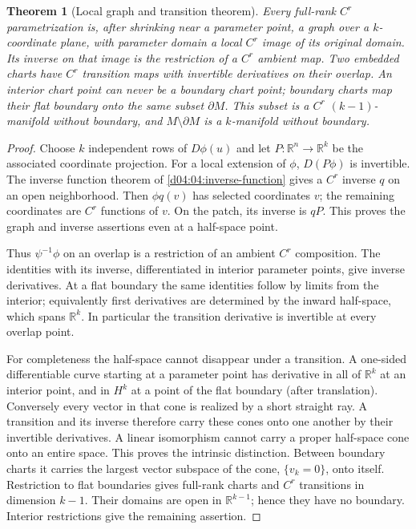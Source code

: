 \documentclass[11pt,oneside,openany]{book}
\newtheorem{theorem}{Theorem}[chapter]
\theoremstyle{definition}
\theoremstyle{remark}
\newcommand{\R}{\mathbb R}
\begin{document}
\begin{theorem}[Local graph and transition theorem]\label{d04:14:charts}
Every full-rank $C^r$ parametrization is, after shrinking near a parameter
point, a graph over a $k$-coordinate plane, with parameter domain a local
$C^r$ image of its original domain. Its inverse on that image is the
restriction of a $C^r$ ambient map. Two embedded charts have $C^r$
transition maps with invertible derivatives on their overlap. An interior
chart point can never be a boundary chart point; boundary charts map their
flat boundary onto the same subset $\partial M$. This subset is a $C^r$
$(k-1)$-manifold without boundary, and $M\setminus\partial M$ is a
$k$-manifold without boundary.
\end{theorem}
\begin{proof}
Choose $k$ independent rows of $D\phi(u)$ and let $P:\R^n\to\R^k$
be the associated coordinate projection. For a local extension of $\phi$,
$D(P\phi)$ is invertible. The inverse function theorem of
\cref{d04:04:inverse-function} gives a $C^r$ inverse $q$ on an open neighborhood.
Then $\phi q(v)$ has selected coordinates $v$; the remaining coordinates
are $C^r$ functions of $v$. On the patch, its inverse is $qP$. This proves
the graph and inverse assertions even at a half-space point.

Thus $\psi^{-1}\phi$ on an overlap is a restriction of an ambient $C^r$
composition. The identities with its inverse, differentiated in interior
parameter points, give inverse derivatives. At a flat boundary the same
identities follow by limits from the interior; equivalently first derivatives
are determined by the inward half-space, which spans $\R^k$. In particular
the transition derivative is invertible at every overlap point.

For completeness the half-space cannot disappear under a transition. A
one-sided differentiable curve starting at a parameter point has derivative
in all of $\R^k$ at an interior point, and in $H^k$ at a point of the flat
boundary (after translation). Conversely every vector in that cone is
realized by a short straight ray. A transition and its inverse therefore
carry these cones onto one another by their invertible derivatives. A
linear isomorphism cannot carry a proper half-space cone onto an entire
space. This proves the intrinsic distinction. Between boundary charts it
carries the largest vector subspace of the cone, $\{v_k=0\}$, onto itself.
Restriction to flat boundaries gives full-rank charts and $C^r$ transitions
in dimension $k-1$. Their domains are open in $\R^{k-1}$; hence they have
no boundary. Interior restrictions give the remaining assertion.
\end{proof}
\end{document}
